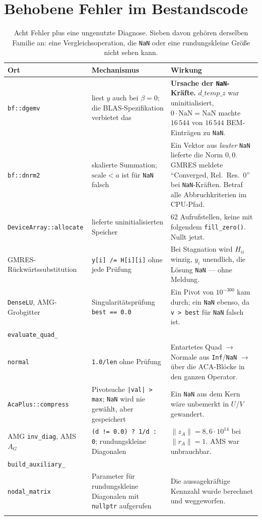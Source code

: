 \documentclass[11pt,a4paper]{article}
\newcommand{\code}[1]{\texttt{\small #1}}
\begin{document}
\section{Behobene Fehler im Bestandscode}

\small
\begin{longtable}{p{3.2cm}p{5.0cm}p{5.8cm}}
\toprule
\textbf{Ort} & \textbf{Mechanismus} & \textbf{Wirkung} \\
\midrule
\endhead
\code{bf::dgemv}
  & liest $y$ auch bei $\beta=0$; die BLAS-Spezifikation verbietet das
  & \textbf{Ursache der \code{NaN}-Kräfte.} $d\_temp\_z$ war uninitialisiert,
    $0\cdot\text{NaN}=\text{NaN}$ machte $16\,544$ von $16\,544$ BEM-Einträgen
    zu \code{NaN}. \\
\addlinespace
\code{bf::dnrm2}
  & skalierte Summation; $\text{scale} < a$ ist für \code{NaN} falsch
  & Ein Vektor aus \emph{lauter} \code{NaN} lieferte die Norm $0{,}0$. GMRES
    meldete \textquotedblleft Converged, Rel.\ Res.\ 0\textquotedblright{} bei \code{NaN}-Kräften. Betraf
    alle Abbruchkriterien im CPU-Pfad. \\
\addlinespace
\code{DeviceArray::allocate}
  & lieferte uninitialisierten Speicher
  & 62 Aufrufstellen, keine mit folgendem \code{fill\_zero()}. Nullt jetzt. \\
\addlinespace
GMRES-Rück\-wärts\-sub\-sti\-tu\-tion
  & \code{y[i] /= H[i][i]} ohne jede Prüfung
  & Bei Stagnation wird $H_{ii}$ winzig, $y_i$ unendlich, die Lösung
    \code{NaN} --- ohne Meldung. \\
\addlinespace
\code{DenseLU}, AMG-Grobgitter
  & Singularitätsprüfung \code{best == 0.0}
  & Ein Pivot von $10^{-300}$ kam durch; ein \code{NaN} ebenso, da
    \code{v > best} für \code{NaN} falsch ist. \\
\addlinespace
\code{evaluate\_quad\_}\\\code{normal}
  & \code{1.0/len} ohne Prüfung
  & Entartetes Quad $\to$ Normale aus \code{Inf}/\code{NaN} $\to$ über die
    ACA-Blöcke in den ganzen Operator. \\
\addlinespace
\code{AcaPlus::compress}
  & Pivotsuche \code{|val| > max}; \code{NaN} wird nie gewählt, aber
    gespeichert
  & Ein \code{NaN} aus dem Kern wäre unbemerkt in $U$/$V$ gewandert. \\
\addlinespace
AMG \code{inv\_diag}, AMS $A_G$
  & \code{(d != 0.0) ? 1/d : 0}; rundungskleine Diagonalen
  & $\|z_A\| = 8{,}6\cdot10^{14}$ bei $\|r_A\|=1$. AMS war unbrauchbar. \\
\addlinespace
\code{build\_auxiliary\_}\\\code{nodal\_matrix}
  & Parameter für rundungskleine Diagonalen mit \code{nullptr} aufgerufen
  & Die aussagekräftige Kennzahl wurde berechnet und weggeworfen. \\
\bottomrule
\caption{Acht Fehler plus eine ungenutzte Diagnose. Sieben davon gehören
derselben Familie an: eine Vergleichsoperation, die \code{NaN} oder eine
rundungskleine Größe nicht sehen kann.}
\end{longtable}
\end{document}
